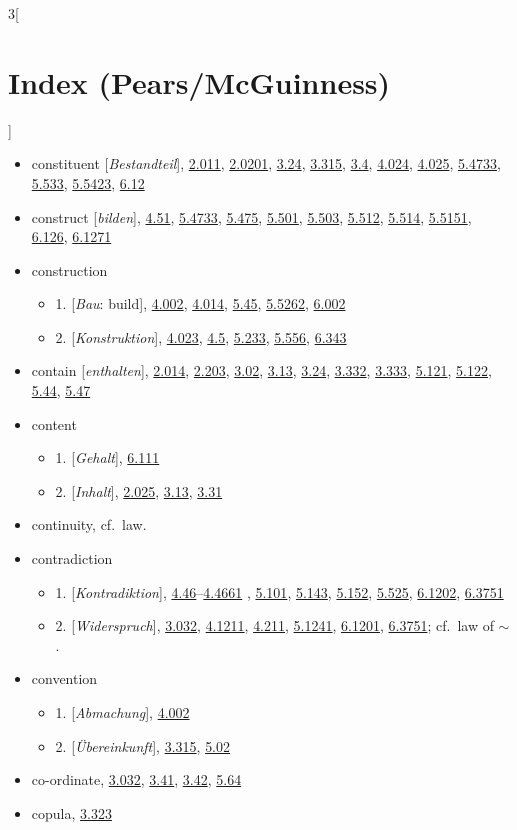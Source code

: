 \documentclass[oneside,openany,12pt]{book}
\newcommand{\indexentry}[1]{\item #1}
\newcommand{\indexsubentry}[1]{\begin{itemize} \item #1 \end{itemize}}
\newcommand{\indexref}[1]{\hyperlink{prop#1}{#1}}
\begin{document}
\begin{multicols}{3}[\section*{Index (Pears/McGuinness)}]
\begin{itemize}
\indexentry{constituent [\textit{Bestandteil}], \indexref{2.011}, \indexref{2.0201}, \indexref{3.24}, \indexref{3.315}, \indexref{3.4}, \indexref{4.024}, \indexref{4.025}, \indexref{5.4733}, \indexref{5.533}, \indexref{5.5423}, \indexref{6.12}}

\indexentry{construct [\textit{bilden}], \indexref{4.51}, \indexref{5.4733}, \indexref{5.475}, \indexref{5.501}, \indexref{5.503}, \indexref{5.512}, \indexref{5.514}, \indexref{5.5151}, \indexref{6.126}, \indexref{6.1271}}

\indexentry{construction}

   \indexsubentry{1. [\textit{Bau}: build], \indexref{4.002}, \indexref{4.014}, \indexref{5.45}, \indexref{5.5262}, \indexref{6.002}}

   \indexsubentry{2. [\textit{Konstruktion}], \indexref{4.023}, \indexref{4.5}, \indexref{5.233}, \indexref{5.556}, \indexref{6.343}}

\indexentry{contain [\textit{enthalten}], \indexref{2.014}, \indexref{2.203}, \indexref{3.02}, \indexref{3.13}, \indexref{3.24}, \indexref{3.332}, \indexref{3.333}, \indexref{5.121}, \indexref{5.122}, \indexref{5.44}, \indexref{5.47}}

\indexentry{content}

   \indexsubentry{1. [\textit{Gehalt}], \indexref{6.111}}

   \indexsubentry{2. [\textit{Inhalt}], \indexref{2.025}, \indexref{3.13}, \indexref{3.31}}

\indexentry{continuity, cf.\ law.}

\indexentry{contradiction}

   \indexsubentry{1. [\textit{Kontradiktion}], \indexref{4.46}--\indexref{4.4661} , \indexref{5.101}, \indexref{5.143}, \indexref{5.152}, \indexref{5.525}, \indexref{6.1202}, \indexref{6.3751}}

   \indexsubentry{2. [\textit{Widerspruch}], \indexref{3.032}, \indexref{4.1211}, \indexref{4.211}, \indexref{5.1241}, \indexref{6.1201}, \indexref{6.3751}; cf.\ law of $\sim$.}

\indexentry{convention}

   \indexsubentry{1. [\textit{Abmachung}], \indexref{4.002}}

   \indexsubentry{2. [\textit{{\"U}bereinkunft}], \indexref{3.315}, \indexref{5.02}}

\indexentry{co-ordinate, \indexref{3.032}, \indexref{3.41}, \indexref{3.42}, \indexref{5.64}}

\indexentry{copula, \indexref{3.323}}


\end{itemize}
\end{multicols}
\end{document}
